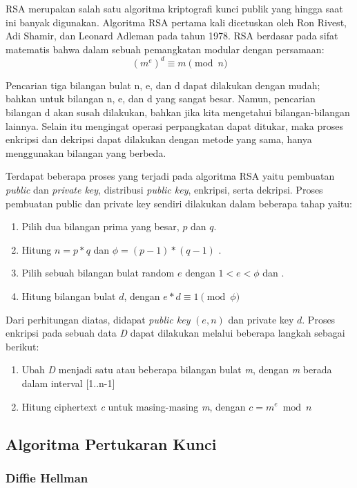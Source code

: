     RSA merupakan salah satu algoritma kriptografi kunci publik yang hingga saat ini banyak digunakan. Algoritma RSA pertama kali dicetuskan oleh Ron Rivest, Adi Shamir, dan Leonard Adleman pada tahun 1978. RSA berdasar pada sifat matematis bahwa dalam sebuah pemangkatan modular dengan persamaan:
    \begin{equation}
      (m^e)^d  \equiv  m \pmod{n}
    \end{equation}

    Pencarian tiga bilangan bulat n, e, dan d dapat dilakukan dengan mudah; bahkan untuk bilangan n, e, dan d yang sangat besar. Namun, pencarian bilangan d akan susah dilakukan, bahkan jika kita mengetahui bilangan-bilangan lainnya. Selain itu mengingat operasi perpangkatan dapat ditukar, maka proses enkripsi dan dekripsi dapat dilakukan dengan metode yang sama, hanya menggunakan bilangan yang berbeda.

    Terdapat beberapa proses yang terjadi pada algoritma RSA yaitu pembuatan \textit{public} dan \textit{private key}, distribusi \textit{public key}, enkripsi, serta dekripsi. Proses pembuatan public dan private key sendiri dilakukan dalam beberapa tahap yaitu:

    \begin{enumerate}
      \item Pilih dua bilangan prima yang besar, $p$ dan $q$.
      \item Hitung $n = p*q$ dan $ \phi = (p-1)*(q-1)$ .
      \item Pilih sebuah bilangan bulat random $e$ dengan $ 1 < e < \phi$ dan .
      \item Hitung bilangan bulat $d$, dengan $ e*d  \equiv  1 \pmod{\phi} $
    \end{enumerate}

    Dari perhitungan diatas, didapat \textit{public key} $(e, n)$ dan private key $d$.
    Proses enkripsi pada sebuah data \textit{D} dapat dilakukan melalui beberapa langkah sebagai berikut:
    \begin{enumerate}
      \item Ubah \textit{D} menjadi satu atau beberapa bilangan bulat \textit{m}, dengan \textit{m} berada dalam interval [1..n-1]
      \item Hitung ciphertext \textit{c} untuk masing-masing \textit{m}, dengan $c = m^e \bmod n $
    \end{enumerate}
\subsection{Algoritma Pertukaran Kunci}
\subsubsection{Diffie Hellman}
